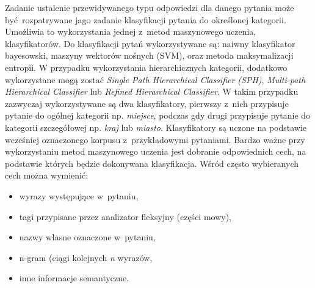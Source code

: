 \documentclass[a4paper, twoside, 12pt]{report}
\begin{document}
            Zadanie ustalenie przewidywanego typu odpowiedzi dla danego pytania może być rozpatrywane jago zadanie
            klasyfikacji pytania do określonej kategorii. Umożliwia to wykorzystania jednej z~metod maszynowego uczenia,
            klasyfikatorów. Do klasyfikacji pytań wykorzystywane są: naiwny klasyfikator bayesowski, maszyny wektorów
            nośnych (SVM), oraz metoda maksymalizacji entropii. W przypadku wykorzystania hierarchicznych kategorii,
            dodatkowo wykorzystane mogą zostać \emph{Single Path Hierarchical Classifier (SPH)}, \emph{Multi-path
            Hierarchical Classifier} lub \emph{Refined Hierarchical Classifier}\cite{MLQUESTIONFOCUS}. W takim przypadku
            zazwyczaj wykorzystywane są dwa klasyfikatory, pierwszy z~nich przypisuje pytanie do ogólnej kategorii np.
            \emph{miejsce}, podczas gdy drugi przypisuje pytanie do kategorii szczegółowej np. \emph{kraj} lub \emph{miasto}.
            Klasyfikatory
            są uczone na podstawie wcześniej oznaczonego korpusu z~przykładowymi pytaniami. Bardzo ważne przy wykorzystaniu
            metod maszynowego uczenia jest dobranie odpowiednich cech, na podstawie których będzie dokonywana klasyfikacja.
            Wśród często wybieranych cech można wymienić\cite{HANDBOOKNLP}:
            \begin{itemize}
                \item wyrazy występujące w~pytaniu,
                \item tagi przypisane przez analizator fleksyjny (części mowy),
                \item nazwy własne oznaczone w~pytaniu,
                \item n-gram (ciągi kolejnych \emph{n} wyrazów,
                \item inne informacje semantyczne.
            \end{itemize}
\end{document}
